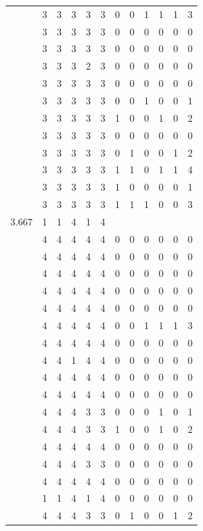 \documentclass[]{book}
\theoremstyle{definition}
\theoremstyle{definition}
\theoremstyle{definition}
\theoremstyle{remark}
\begin{document}
\begin{table}
{\begin{tabular}[t]{rrrrrrrrrrrr}
 & 3 & 3 & 3 & 3 & 3 & 0 & 0 & 1 & 1 & 1 & 3\\
 & 3 & 3 & 3 & 3 & 3 & 0 & 0 & 0 & 0 & 0 & 0\\
 & 3 & 3 & 3 & 3 & 3 & 0 & 0 & 0 & 0 & 0 & 0\\
 & 3 & 3 & 3 & 2 & 3 & 0 & 0 & 0 & 0 & 0 & 0\\
 & 3 & 3 & 3 & 3 & 3 & 0 & 0 & 0 & 0 & 0 & 0\\
 & 3 & 3 & 3 & 3 & 3 & 0 & 0 & 1 & 0 & 0 & 1\\
 & 3 & 3 & 3 & 3 & 3 & 1 & 0 & 0 & 1 & 0 & 2\\
 & 3 & 3 & 3 & 3 & 3 & 0 & 0 & 0 & 0 & 0 & 0\\
 & 3 & 3 & 3 & 3 & 3 & 0 & 1 & 0 & 0 & 1 & 2\\
 & 3 & 3 & 3 & 3 & 3 & 1 & 1 & 0 & 1 & 1 & 4\\
 & 3 & 3 & 3 & 3 & 3 & 1 & 0 & 0 & 0 & 0 & 1\\
 & 3 & 3 & 3 & 3 & 3 & 1 & 1 & 1 & 0 & 0 & 3\\
3.667 & 1 & 1 & 4 & 1 & 4 &  &  &  &  &  & \\
 & 4 & 4 & 4 & 4 & 4 & 0 & 0 & 0 & 0 & 0 & 0\\
 & 4 & 4 & 4 & 4 & 4 & 0 & 0 & 0 & 0 & 0 & 0\\
 & 4 & 4 & 4 & 4 & 4 & 0 & 0 & 0 & 0 & 0 & 0\\
 & 4 & 4 & 4 & 4 & 4 & 0 & 0 & 0 & 0 & 0 & 0\\
 & 4 & 4 & 4 & 4 & 4 & 0 & 0 & 0 & 0 & 0 & 0\\
 & 4 & 4 & 4 & 4 & 4 & 0 & 0 & 1 & 1 & 1 & 3\\
 & 4 & 4 & 4 & 4 & 4 & 0 & 0 & 0 & 0 & 0 & 0\\
 & 4 & 4 & 1 & 4 & 4 & 0 & 0 & 0 & 0 & 0 & 0\\
 & 4 & 4 & 4 & 4 & 4 & 0 & 0 & 0 & 0 & 0 & 0\\
 & 4 & 4 & 4 & 4 & 4 & 0 & 0 & 0 & 0 & 0 & 0\\
 & 4 & 4 & 4 & 3 & 3 & 0 & 0 & 0 & 1 & 0 & 1\\
 & 4 & 4 & 4 & 3 & 3 & 1 & 0 & 0 & 1 & 0 & 2\\
 & 4 & 4 & 4 & 4 & 4 & 0 & 0 & 0 & 0 & 0 & 0\\
 & 4 & 4 & 4 & 3 & 3 & 0 & 0 & 0 & 0 & 0 & 0\\
 & 4 & 4 & 4 & 4 & 4 & 0 & 0 & 0 & 0 & 0 & 0\\
 & 1 & 1 & 4 & 1 & 4 & 0 & 0 & 0 & 0 & 0 & 0\\
 & 4 & 4 & 4 & 3 & 3 & 0 & 1 & 0 & 0 & 1 & 2\\

\end{tabular}}
\end{table}
\end{document}

